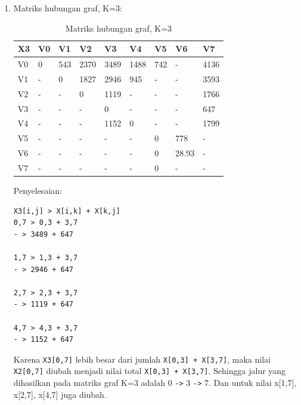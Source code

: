 \begin{enumerate}
\begin{enumerate}
\begin{enumerate}
            \item  Matriks hubungan graf, K=3:
                \begin{table}[!htbp]
                \centering
                \caption{Matriks hubungan graf, K=3}
                \label{table34}
                    \begin{tabular}{|l|l|l|l|l|l|l|l|l|}
                    \hline
                        X3 & V0 & V1 & V2 & V3 & V4 & V5 & V6 & V7 \\
                    \hline
                        V0 & 0 & 543 & 2370 & 3489 & 1488 & 742 & - & 4136 \\
                    \hline
                        V1 & - & 0 & 1827 & 2946 & 945 & - & - & 3593 \\
                    \hline
                        V2 & - & - & 0 & 1119 & - & - & - & 1766 \\
                    \hline
                        V3 & - & - & - & 0 & - & - & - & 647 \\
                    \hline
                        V4 & - & - & - & 1152 & 0 & - & - & 1799 \\
                    \hline
                        V5 & - & - & - & - & - & 0 & 778 & - \\
                    \hline
                       V6 & - & - & - & - & - & 0 & 28.93 & - \\
                    \hline
                       V7 & - & - & - & - & - & 0 & - & - \\
                    \hline
                \end{tabular}
                \end{table}
                
                \vspace{1cm}
                
            \par Penyelesaian:
\begin{verbatim}
X3[i,j] > X[i,k] + X[k,j]
0,7 > 0,3 + 3,7
- > 3489 + 647

1,7 > 1,3 + 3,7
- > 2946 + 647

2,7 > 2,3 + 3,7
- > 1119 + 647

4,7 > 4,3 + 3,7
- > 1152 + 647
\end{verbatim}
            \par Karena \verb|X3[0,7]| lebih besar dari jumlah \verb|X[0,3] + X[3,7]|, maka nilai \verb|X2[0,7]| diubah menjadi nilai total \verb|X[0,3] + X[3,7]|. Sehingga jalur yang dihasilkan pada matriks graf K=3 adalah 0 \verb|->| 3 \verb|->| 7. Dan untuk nilai x[1,7], x[2,7], x[4,7] juga diubah.


\end{enumerate}
\end{enumerate}
\end{enumerate}
